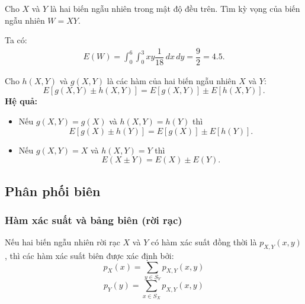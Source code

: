 \documentclass[12pt,a4paper]{article}
\begin{document}
\begin{vidu}
Cho $X$ và $Y$ là hai biến ngẫu nhiên trong mật độ đều trên. Tìm kỳ vọng của biến ngẫu nhiên $W = XY$.

Ta có:
\begin{align*}
  E(W) = \displaystyle\int_{0}^{6} \displaystyle\int_{0}^{3} xy \dfrac{1}{18}\,dx\,dy = \dfrac{9}{2} = 4.5.
\end{align*}
\end{vidu}

\begin{dinhly}[title={Định lý}]
  Cho $h(X, Y )$ và $g(X, Y )$ là các hàm của hai biến ngẫu nhiên $X$ và $Y$:
  \[
    E[g(X, Y ) ± h(X, Y )] = E[g(X, Y )] ± E[h(X, Y )].
  \]
  \textbf{Hệ quả:}
  \begin{itemize}
    \item Nếu $g(X, Y ) = g(X)$ và $h(X, Y ) = h(Y )$ thì
    \[
      E[g(X) ± h(Y )] = E[g(X)] ± E[h(Y )].
    \]
    \item Nếu $g(X, Y ) = X$ và $h(X, Y ) = Y$ thì
    \[
      E(X ± Y ) = E(X) ± E(Y ).
    \]
  \end{itemize}
\end{dinhly}

\subsection{Phân phối biên}

\subsubsection{Hàm xác suất và bảng biên (rời rạc)}

\begin{dinhly}
  Nếu hai biến ngẫu nhiên rời rạc $X$ và $Y$ có hàm xác suất đồng thời là $p_{X,Y}(x, y)$, thì các hàm xác suất biên được xác định bởi:
  \[
    p_X(x) = \displaystyle\sum_{y \in S_Y} p_{X,Y}(x, y)
  \]
  \[
    p_Y(y) = \displaystyle\sum_{x \in S_X} p_{X,Y}(x, y)
  \]
\end{dinhly}
\end{document}
